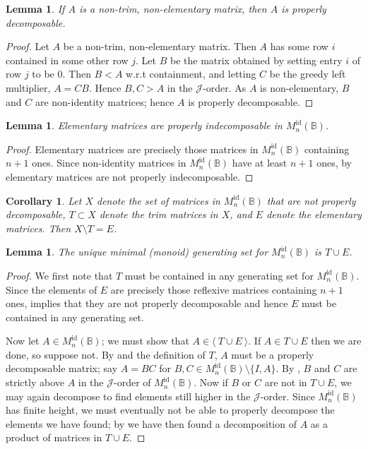\documentclass[11pt]{article}
\newtheorem{cor}[thm]{Corollary}
\newtheorem{lemma}[thm]{Lemma}
\numberwithin{equation}{section}
\newcommand{\genset}[1]{\ensuremath{\langle\: #1 \:\rangle}}
\newcommand{\B}{\mathbb{B}}
\newcommand{\Refn}{M_n^{\text{id}}(\B)}
\newcommand{\J}{\mathscr{J}}
\begin{document}
\begin{lemma}
  If $A$ is a non-trim, non-elementary matrix, then $A$ is properly
  decomposable.
\end{lemma}
\begin{proof}
Let $A$ be a non-trim, non-elementary matrix. Then $A$ has some row $i$
contained in some other row $j$. Let $B$ be the matrix obtained by setting entry
$i$ of row $j$ to be $0$. Then $B < A$ w.r.t containment, and letting $C$ be the
greedy left multiplier, $A = CB$. Hence $B, C > A$ in the $\J$-order. As $A$ is
non-elementary, $B$ and $C$ are non-identity matrices; hence $A$ is properly
decomposable.
\end{proof}

\begin{lemma}
  Elementary matrices are properly indecomposable in $\Refn$.
\end{lemma}
\begin{proof}
  Elementary matrices are precisely those matrices in $\Refn$ containing $n + 1$
  ones. Since non-identity matrices in $\Refn$ have at least $n + 1$ ones, by
   elementary matrices are not properly
  indecomposable.
\end{proof}

\begin{cor}
  Let $X$ denote the set of matrices in $\Refn$ that are not properly
  decomposable, $T \subset X$ denote the trim matrices in $X$, and $E$ denote
  the elementary matrices. Then $X \setminus T = E$. 
\end{cor}

\begin{lemma}
  The unique minimal (monoid) generating set for $\Refn$ is $T \cup E$.
\end{lemma}
\begin{proof}
  We first note that $T$ must be contained in any generating set for $\Refn$.
  Since the elements of $E$ are precisely those reflexive matrices containing
  $n + 1$ ones,  implies that they are not
  properly decomposable and hence $E$ must be contained in any generating set.

  Now let $A \in \Refn$; we must show that $A \in \genset{T \cup E}$. If $A \in
  T \cup E$ then we are done, so suppose not. By
   and the definition of $T$, $A$ must be a
  properly decomposable matrix; say $A = BC$ for $B, C \in \Refn\setminus\{I,
  A\}$. By , $B$ and $C$ are strictly above $A$ in
  the $\J$-order of $\Refn$. Now if $B$ or $C$ are not in $T \cup E$, we may
  again decompose to find elements still higher in the $\J$-order. Since $\Refn$
  has finite height, we must eventually not be able to properly decompose the
  elements we have found; by  we have then
  found a decomposition of $A$ as a product of matrices in $T \cup E$.
\end{proof}
\end{document}
